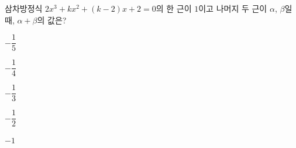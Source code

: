 삼차방정식 $2x^3+kx^2+(k-2)x+2=0$의 한 근이 $1$이고 나머지 두 근이 $\alpha$, $\beta$일 때, $\alpha+\beta$의 값은? 
\begin{choices32}{\rule[-3ex]{0pt}{8ex}$-\dfrac{1}{5}$}{\rule[-3ex]{0pt}{8ex}$-\dfrac{1}{4}$}{\rule[-3ex]{0pt}{8ex}$-\dfrac{1}{3}$}{\rule[-3ex]{0pt}{8ex}$-\dfrac{1}{2}$}{\rule[-3ex]{0pt}{8ex}$-1$}\end{choices32}
